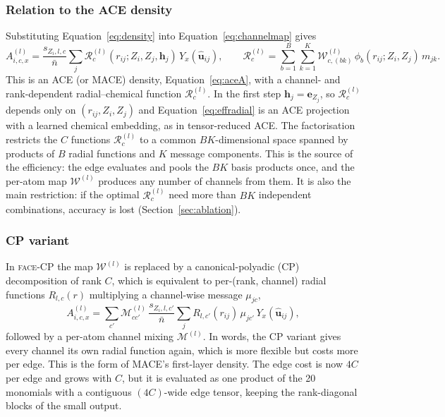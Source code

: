 \documentclass[journal=jctcce,manuscript=article,layout=traditional]{achemso}
\newcommand{\vect}[1]{\bm{#1}}
\newcommand{\FACE}{\textup{\textsc{face}}}
\begin{document}
\subsubsection{Relation to the ACE density}
\label{sec:aceequiv}
Substituting Equation~\ref{eq:density} into Equation~\ref{eq:channelmap} gives
\begin{equation}
A^{(l)}_{i,c,x}=\frac{s_{Z_i,l,c}}{\bar n}\sum_j\mathcal R^{(l)}_c(r_{ij};Z_i,Z_j,\vect h_j)\,Y_x(\hat{\vect u}_{ij}),
\qquad
\mathcal R^{(l)}_c=\sum_{b=1}^{B}\sum_{k=1}^{K}\mathcal W^{(l)}_{c,(bk)}\,\phi_b(r_{ij};Z_i,Z_j)\,m_{jk}.
\label{eq:effradial}
\end{equation}
This is an ACE (or MACE) density, Equation~\ref{eq:aceA}, with a channel- and rank-dependent radial--chemical function
$\mathcal R^{(l)}_c$. In the first step $\vect h_j=\vect e_{Z_j}$, so $\mathcal R^{(l)}_c$ depends only on
$(r_{ij},Z_i,Z_j)$ and Equation~\ref{eq:effradial} is an ACE projection with a learned chemical embedding, as in
tensor-reduced ACE\cite{darby2022tensorreduced}. The factorisation restricts the $C$ functions $\mathcal R^{(l)}_c$
to a common $BK$-dimensional space spanned by products of $B$ radial functions and $K$ message components. This is
the source of the efficiency: the edge evaluates and pools the $BK$ basis products once, and the per-atom map
$\mathcal W^{(l)}$ produces any number of channels from them. It is also the main restriction: if the optimal
$\mathcal R^{(l)}_c$ need more than $BK$ independent combinations, accuracy is lost (Section~\ref{sec:ablation}).

\subsubsection{CP variant}
In \FACE-CP the map $\mathcal W^{(l)}$ is replaced by a canonical-polyadic (CP) decomposition\cite{kolda2009tensor}
of rank $C$, which is equivalent to per-(rank, channel) radial functions $R_{l,c}(r)$ multiplying a channel-wise
message $\mu_{jc}$,
\begin{equation}
A^{(l)}_{i,c,x}=\sum_{c'}\mathcal M^{(l)}_{cc'}\,\frac{s_{Z_i,l,c'}}{\bar n}\sum_j R_{l,c'}(r_{ij})\,\mu_{jc'}\,Y_x(\hat{\vect u}_{ij}),
\label{eq:cp}
\end{equation}
followed by a per-atom channel mixing $\mathcal M^{(l)}$. In words, the CP variant gives every channel its own
radial function again, which is more flexible but costs more per edge. This is the form of MACE's first-layer
density. The edge
cost is now $4C$ per edge and grows with $C$, but it is evaluated as one product of the 20 monomials with a
contiguous $(4C)$-wide edge tensor, keeping the rank-diagonal blocks of the small output.
\end{document}
